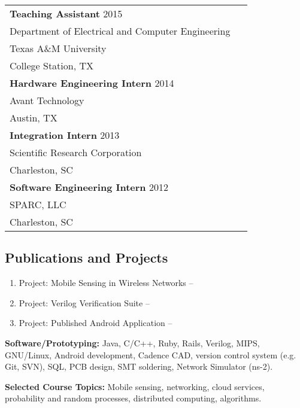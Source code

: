 \begin{center}
\begin{tabular}{p{0.95\linewidth}}
\textbf{Teaching Assistant} \hfill 2015 \\
Department of Electrical and Computer Engineering \\
Texas A\&M University \\
College Station, TX \\[4pt]
\textbf{Hardware Engineering Intern} \hfill 2014 \\
Avant Technology \\
Austin, TX \\[4pt]
\textbf{Integration Intern} \hfill 2013 \\
Scientific Research Corporation \\
Charleston, SC \\[4pt]
\textbf{Software Engineering Intern} \hfill 2012 \\
SPARC, LLC \\
Charleston, SC
\end{tabular}
\end{center}

\subsection*{Publications and Projects}

\begin{enumerate}    \itemsep0pt
\item Project: Mobile Sensing in Wireless Networks --

\item Project: Verilog Verification Suite --

\item Project: Published Android Application --
\end{enumerate}

\textbf{Software/Prototyping:} Java, C/C++, Ruby, Rails, Verilog, MIPS, GNU/Linux, Android development, Cadence CAD, version control system (e.g. Git, SVN), SQL, PCB design, SMT soldering, Network Simulator (ns-2).

\textbf{Selected Course Topics:}  Mobile sensing, networking, cloud services, probability and random processes, distributed computing, algorithms.

